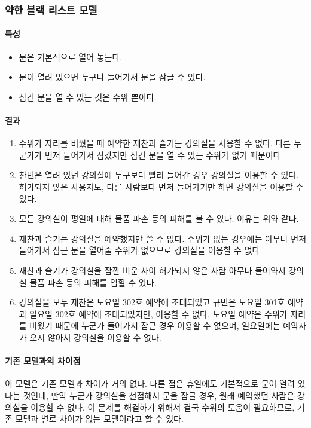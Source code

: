 \documentclass[11pt,a4paper]{article}
\begin{document}
\subsubsection{약한 블랙 리스트 모델}

\paragraph{특성}
\begin{itemize}
\item 문은 기본적으로 열어 놓는다.
\item 문이 열려 있으면 누구나 들어가서 문을 잠글 수 있다.
\item 잠긴 문을 열 수 있는 것은 수위 뿐이다.
\end{itemize}

\paragraph{결과}
\begin{enumerate}
\item 수위가 자리를 비웠을 때 예약한 재찬과 슬기는 강의실을 사용할 수 없다. 다른 누군가가 먼저 들어가서 잠갔지만 잠긴 문을 열 수 있는 수위가 없기 때문이다.
\item 찬민은 열려 있던 강의실에 누구보다 빨리 들어간 경우 강의실을 이용할 수 있다. 허가되지 않은 사용자도, 다른 사람보다 먼저 들어가기만 하면 강의실을 이용할 수 있다.
\item 모든 강의실이 평일에 대해 물품 파손 등의 피해를 볼 수 있다. 이유는 위와 같다.
\item 재찬과 슬기는 강의실을 예약했지만 쓸 수 없다. 수위가 없는 경우에는 아무나 먼저 들어가서 잠근 문을 열어줄 수위가 없으므로 강의실을 이용할 수 없다.
\item 재찬과 슬기가 강의실을 잠깐 비운 사이 허가되지 않은 사람 아무나 들어와서 강의실 물품 파손 등의 피해를 입힐 수 있다.
\item 강의실을 모두 재찬은 토요일 302호 예약에 초대되었고 규민은 토요일 301호 예약과 일요일 302호 예약에 초대되었지만, 이용할 수 없다. 토요일 예약은 수위가 자리를 비웠기 때문에 누군가 들어가서 잠근 경우 이용할 수 없으며, 일요일에는 예약자가 오지 않아서 강의실을 이용할 수 없다.
\end{enumerate}

\paragraph{기존 모델과의 차이점}
\hfill\break
이 모델은 기존 모델과 차이가 거의 없다. 다른 점은 휴일에도 기본적으로 문이 열려 있다는 것인데, 만약 누군가 강의실을 선점해서 문을 잠글 경우, 원래 예약했던 사람은 강의실을 이용할 수 없다. 이 문제를 해결하기 위해서 결국 수위의 도움이 필요하므로, 기존 모델과 별로 차이가 없는 모델이라고 할 수 있다.
\end{document}
